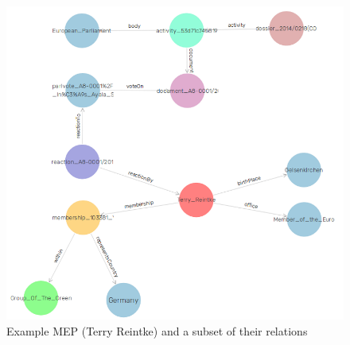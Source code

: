\documentclass{article}
\begin{document}
\begin{figure}
  \centering
  \includegraphics[width=1\linewidth]{images/graph.png}
  \caption{Example MEP (Terry Reintke) and a subset of their relations}
  \label{fig:mepGraph}
\end{figure}
\end{document}
